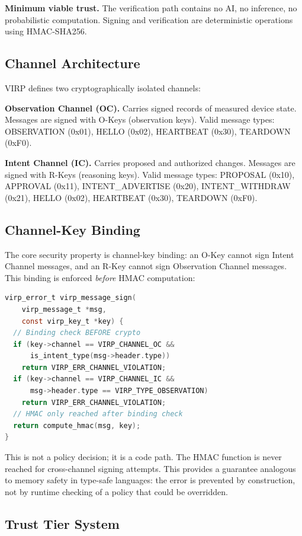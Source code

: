 \documentclass[11pt,twocolumn]{article}
\begin{document}
\textbf{Minimum viable trust.} The verification path contains no AI, no inference, no probabilistic computation. Signing and verification are deterministic operations using HMAC-SHA256.

\subsection{Channel Architecture}

VIRP defines two cryptographically isolated channels:

\textbf{Observation Channel (OC).} Carries signed records of measured device state. Messages are signed with O-Keys (observation keys). Valid message types: OBSERVATION (0x01), HELLO (0x02), HEARTBEAT (0x30), TEARDOWN (0xF0).

\textbf{Intent Channel (IC).} Carries proposed and authorized changes. Messages are signed with R-Keys (reasoning keys). Valid message types: PROPOSAL (0x10), APPROVAL (0x11), INTENT\_ADVERTISE (0x20), INTENT\_WITHDRAW (0x21), HELLO (0x02), HEARTBEAT (0x30), TEARDOWN (0xF0).

\subsection{Channel-Key Binding}

The core security property is channel-key binding: an O-Key cannot sign Intent Channel messages, and an R-Key cannot sign Observation Channel messages. This binding is enforced \textit{before} HMAC computation:

\begin{lstlisting}[language=C]
virp_error_t virp_message_sign(
    virp_message_t *msg,
    const virp_key_t *key) {
  // Binding check BEFORE crypto
  if (key->channel == VIRP_CHANNEL_OC &&
      is_intent_type(msg->header.type))
    return VIRP_ERR_CHANNEL_VIOLATION;
  if (key->channel == VIRP_CHANNEL_IC &&
      msg->header.type == VIRP_TYPE_OBSERVATION)
    return VIRP_ERR_CHANNEL_VIOLATION;
  // HMAC only reached after binding check
  return compute_hmac(msg, key);
}
\end{lstlisting}

This is not a policy decision; it is a code path. The HMAC function is never reached for cross-channel signing attempts. This provides a guarantee analogous to memory safety in type-safe languages: the error is prevented by construction, not by runtime checking of a policy that could be overridden.

\subsection{Trust Tier System}
\end{document}
